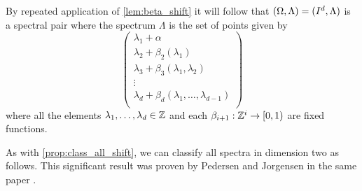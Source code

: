 \documentclass[../thesis.tex]{subfiles}
\begin{document}
\begin{example}
    By repeated application of \cref{lem:beta_shift} it will follow that $(\Omega,\Lambda)= (I^d, \Lambda)$ is a spectral pair where 
    the spectrum $\Lambda$ is the set of points given by
    \begin{equation*}
        \begin{pmatrix}
            \lambda_1 +\alpha\\
            \lambda_2+\beta_2(\lambda_1)\\
            \lambda_3+\beta_3(\lambda_1,\lambda_2)\\
            \vdots\\
            \lambda_d+\beta_d(\lambda_1,\dots,\lambda_{d-1})\\
        \end{pmatrix}
    \end{equation*}
    where all the elements $\lambda_1, \dots, \lambda_d \in \mathbb{Z}$ and each $\beta_{i+1}:\mathbb{Z}^{i} \rightarrow [0,1)$ are fixed functions.
\end{example}



As with \cref{prop:class_all_shift}, we can classify all spectra in dimension two as follows. This significant result was proven by Pedersen and Jorgensen in the same paper \cite{jorgensenSpectralPairsCartesian2001}. 
\end{document}
